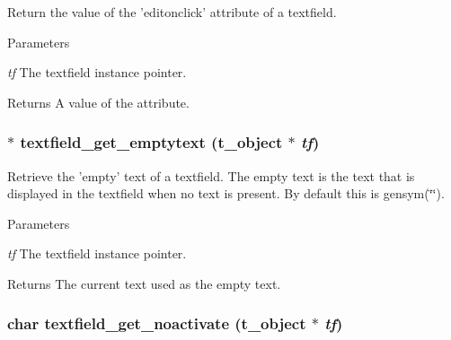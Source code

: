 Return the value of the 'editonclick' attribute of a textfield. 
\begin{DoxyParams}{Parameters}
\item[{\em tf}]The textfield instance pointer. \end{DoxyParams}
\begin{DoxyReturn}{Returns}
A value of the attribute. 
\end{DoxyReturn}
\hypertarget{group__textfield_ga9abc9b5b91181e224a1ea249786b002f}{
\subsubsection[{textfield\_\-get\_\-emptytext}]{$\ast$ textfield\_\-get\_\-emptytext ({\bf t\_\-object} $\ast$ {\em tf})}}
\label{group__textfield_ga9abc9b5b91181e224a1ea249786b002f}


Retrieve the 'empty' text of a textfield. The empty text is the text that is displayed in the textfield when no text is present. By default this is gensym(\char`\"{}\char`\"{}).


\begin{DoxyParams}{Parameters}
\item[{\em tf}]The textfield instance pointer. \end{DoxyParams}
\begin{DoxyReturn}{Returns}
The current text used as the empty text. 
\end{DoxyReturn}
\hypertarget{group__textfield_ga0d565f3cd53ee1b93ae596a5669b9ebd}{
\subsubsection[{textfield\_\-get\_\-noactivate}]{\setlength{\rightskip}{0pt plus 5cm}char textfield\_\-get\_\-noactivate ({\bf t\_\-object} $\ast$ {\em tf})}}
\label{group__textfield_ga0d565f3cd53ee1b93ae596a5669b9ebd}


